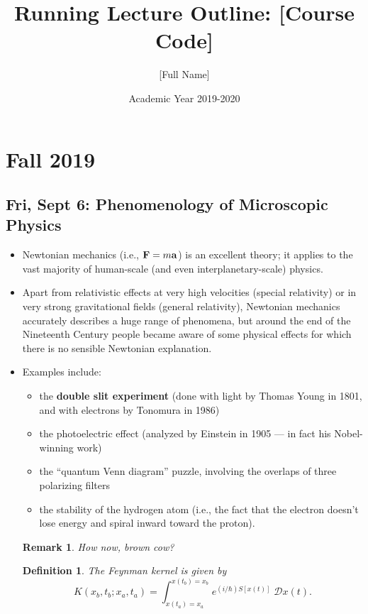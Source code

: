 \documentclass[10pt, oneside]{article}
\title{Running Lecture Outline: [Course Code]}
\author{[Full Name]}
\date{Academic Year 2019-2020}
\newtheorem{defn}{Definition}
\newtheorem{rem}{Remark}
\begin{document}
\maketitle
\tableofcontents

\vspace{.25in}

\section{Fall 2019}

\subsection{Fri, Sept 6: Phenomenology of Microscopic Physics}

\begin{itemize}

\item Newtonian mechanics (i.e., ${\bf F} = m{\bf a}$) is an excellent theory; it applies to the vast majority of human-scale (and even interplanetary-scale) physics. 

\item Apart from relativistic effects at very high velocities (special relativity) or in very strong gravitational fields (general relativity), Newtonian mechanics accurately describes a huge range of phenomena, but around the end of the Nineteenth Century people became aware of some physical effects for which there is no sensible Newtonian explanation.

\item Examples include:
\begin{itemize}
\item the {\bf double slit experiment} (done with light by Thomas Young in 1801, and with electrons by Tonomura in 1986)
\item the photoelectric effect (analyzed by Einstein in 1905 --- in fact his Nobel-winning work)
\item the ``quantum Venn diagram'' puzzle, involving the overlaps of three polarizing filters
\item the stability of the hydrogen atom (i.e., the fact that the electron doesn't lose energy and spiral inward toward the proton).
\end{itemize}

\begin{rem}
How now, brown cow?
\end{rem}

\begin{defn}
The {\em Feynman kernel} is given by
\[ K(x_b, t_b; x_a, t_a) = \int_{x(t_a) = x_a}^{x(t_b) = x_b} e^{(i/\hbar) S[x(t)]} \; \mathcal{D}x(t). \]
\end{defn}

\end{itemize}
\end{document}
